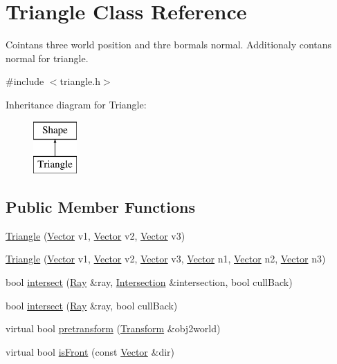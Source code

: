 \hypertarget{class_triangle}{}\section{Triangle Class Reference}
\label{class_triangle}


Cointans three world position and thre bormals normal. Additionaly contans normal for triangle.  




{\ttfamily \#include $<$triangle.\+h$>$}

Inheritance diagram for Triangle\+:\begin{figure}[H]
\begin{center}
\leavevmode
\includegraphics[height=2.000000cm]{class_triangle}
\end{center}
\end{figure}
\subsection*{Public Member Functions}
\begin{DoxyCompactItemize}
\item 
\mbox{\hyperlink{class_triangle_a903d25822fb5103ea3dcb03efa0cea2a}{Triangle}} (\mbox{\hyperlink{struct_vector}{Vector}} v1, \mbox{\hyperlink{struct_vector}{Vector}} v2, \mbox{\hyperlink{struct_vector}{Vector}} v3)
\item 
\mbox{\hyperlink{class_triangle_a54140a599b11aa207d2dd46369ff94b4}{Triangle}} (\mbox{\hyperlink{struct_vector}{Vector}} v1, \mbox{\hyperlink{struct_vector}{Vector}} v2, \mbox{\hyperlink{struct_vector}{Vector}} v3, \mbox{\hyperlink{struct_vector}{Vector}} n1, \mbox{\hyperlink{struct_vector}{Vector}} n2, \mbox{\hyperlink{struct_vector}{Vector}} n3)
\item 
bool \mbox{\hyperlink{class_triangle_ad78a148da18386f99f23731ce7de431f}{intersect}} (\mbox{\hyperlink{class_ray}{Ray}} \&ray, \mbox{\hyperlink{class_intersection}{Intersection}} \&intersection, bool cull\+Back)
\item 
bool \mbox{\hyperlink{class_triangle_abf8edc617d32e7c651a01efc0cb4647e}{intersect}} (\mbox{\hyperlink{class_ray}{Ray}} \&ray, bool cull\+Back)
\item 
virtual bool \mbox{\hyperlink{class_triangle_a8fef25a36bfe124a5e632e4f9fe2726f}{pretransform}} (\mbox{\hyperlink{class_transform}{Transform}} \&obj2world)
\item 
virtual bool \mbox{\hyperlink{class_triangle_a3c33c1eb1d04b85a40426d3a14819d74}{is\+Front}} (const \mbox{\hyperlink{struct_vector}{Vector}} \&dir)
\end{DoxyCompactItemize}


